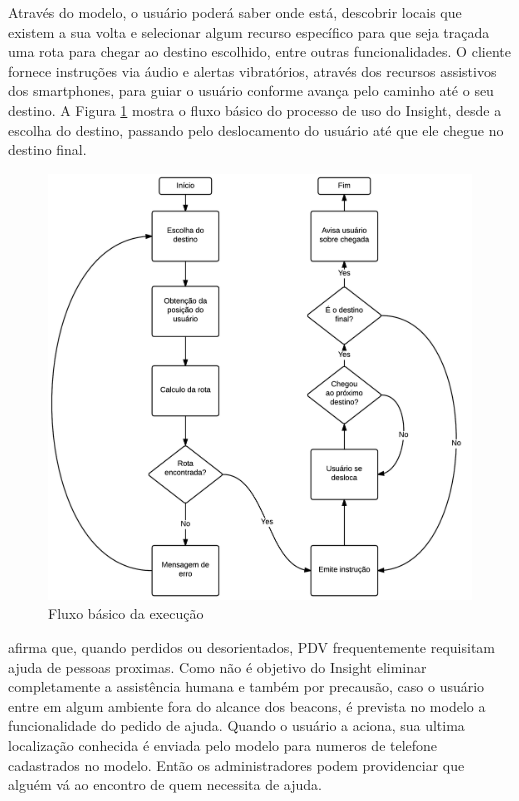 \documentclass[english,brazilian]{UNISINOSmonografia}
\begin{document}
Através do modelo, o usuário poderá saber onde está, descobrir locais que existem a sua volta e selecionar algum recurso específico para que seja traçada uma rota para chegar ao destino escolhido, entre outras funcionalidades. O cliente fornece instruções via áudio e alertas vibratórios, através dos recursos assistivos dos smartphones, para guiar o usuário conforme avança pelo caminho até o seu destino. A Figura \ref{fig:fluxoBasico} mostra o fluxo básico do processo de uso do Insight, desde a escolha do destino, passando pelo deslocamento do usuário até que ele chegue no destino final.

\begin{figure}[!ht]
	\caption{Fluxo básico da execução}
	\label{fig:fluxoBasico}
	\centering%
	\begin{minipage}{.8\textwidth}
		\includegraphics[width=\textwidth]{imgs/fluxoBasico}
	\end{minipage}
\end{figure}

 afirma que, quando perdidos ou desorientados, PDV frequentemente requisitam ajuda de pessoas proximas. Como não é objetivo do Insight eliminar completamente a assistência humana e também por precausão, caso o usuário entre em algum ambiente fora do alcance dos beacons, é prevista no modelo a funcionalidade do pedido de ajuda. Quando o usuário a aciona, sua ultima localização conhecida é enviada pelo modelo para numeros de telefone cadastrados no modelo. Então os administradores podem providenciar que alguém vá ao encontro de quem necessita de ajuda.
\end{document}
